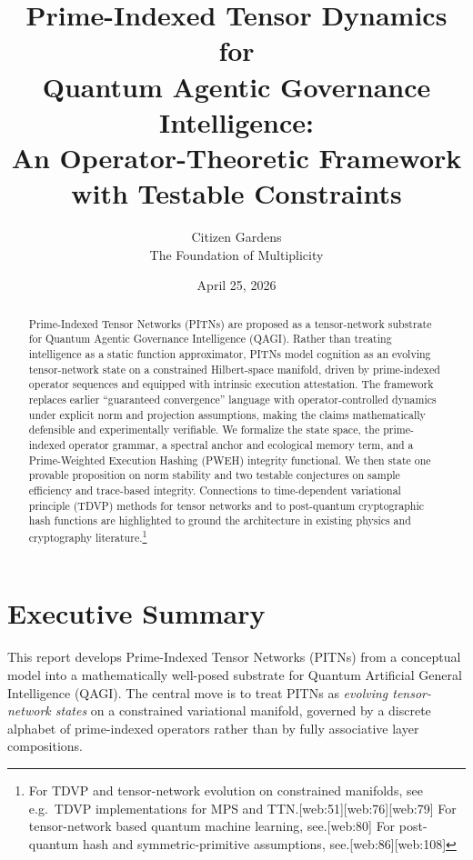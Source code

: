 \documentclass[11pt]{article}
\title{Prime-Indexed Tensor Dynamics for \\ Quantum Agentic Governance Intelligence:\\
An Operator-Theoretic Framework with Testable Constraints}
\author{Citizen Gardens \\ The Foundation of Multiplicity}
\date{April 25, 2026}
\begin{document}
\maketitle

\begin{abstract}
Prime-Indexed Tensor Networks (PITNs) are proposed as a tensor-network substrate for Quantum Agentic Governance Intelligence (QAGI). Rather than treating intelligence as a static function approximator, PITNs model cognition as an evolving tensor-network state on a constrained Hilbert-space manifold, driven by prime-indexed operator sequences and equipped with intrinsic execution attestation. The framework replaces earlier ``guaranteed convergence'' language with operator-controlled dynamics under explicit norm and projection assumptions, making the claims mathematically defensible and experimentally verifiable. We formalize the state space, the prime-indexed operator grammar, a spectral anchor and ecological memory term, and a Prime-Weighted Execution Hashing (PWEH) integrity functional. We then state one provable proposition on norm stability and two testable conjectures on sample efficiency and trace-based integrity. Connections to time-dependent variational principle (TDVP) methods for tensor networks and to post-quantum cryptographic hash functions are highlighted to ground the architecture in existing physics and cryptography literature.\footnote{For TDVP and tensor-network evolution on constrained manifolds, see e.g.\ TDVP implementations for MPS and TTN.[web:51][web:76][web:79] For tensor-network based quantum machine learning, see.[web:80] For post-quantum hash and symmetric-primitive assumptions, see.[web:86][web:108]} 
\end{abstract}
\newpage
\tableofcontents
\newpage
\section{Executive Summary}

This report develops Prime-Indexed Tensor Networks (PITNs) from a conceptual model into a mathematically well-posed substrate for Quantum Artificial General Intelligence (QAGI). The central move is to treat PITNs as \emph{evolving tensor-network states} on a constrained variational manifold, governed by a discrete alphabet of prime-indexed operators rather than by fully associative layer compositions.

\medskip
\end{document}
